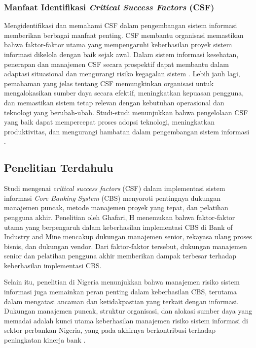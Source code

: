 \documentclass[journal,article,submit,pdftex,moreauthors]{Definitions/mdpi}
\begin{document}
\subsubsection{Manfaat Identifikasi \textit{Critical Success Factors} (CSF)}
Mengidentifikasi dan memahami CSF dalam pengembangan sistem informasi memberikan berbagai manfaat penting. CSF membantu organisasi memastikan bahwa faktor-faktor utama yang mempengaruhi keberhasilan proyek sistem informasi dikelola dengan baik sejak awal. Dalam sistem informasi kesehatan, penerapan dan manajemen CSF secara prospektif dapat membantu dalam adaptasi situasional dan mengurangi risiko kegagalan sistem \cite{aggestam2023apply}. Lebih jauh lagi, pemahaman yang jelas tentang CSF memungkinkan organisasi untuk mengalokasikan sumber daya secara efektif, meningkatkan kepuasan pengguna, dan memastikan sistem tetap relevan dengan kebutuhan operasional dan teknologi yang berubah-ubah. Studi-studi menunjukkan bahwa pengelolaan CSF yang baik dapat mempercepat proses adopsi teknologi, meningkatkan produktivitas, dan mengurangi hambatan dalam pengembangan sistem informasi \cite{jayakody2023devops}.


\subsection{Penelitian Terdahulu} \label{sec:Penelitian Terdahulu}

Studi mengenai \textit{critical success factors} (CSF) dalam implementasi sistem informasi \textit{Core Banking System} (CBS) menyoroti pentingnya dukungan manajemen puncak, metode manajemen proyek yang tepat, dan pelatihan pengguna akhir. Penelitian oleh Ghafari, H \cite{Ghafari-csf} menemukan bahwa faktor-faktor utama yang berpengaruh dalam keberhasilan implementasi CBS di Bank of Industry and Mine mencakup dukungan manajemen senior, rekayasa ulang proses bisnis, dan dukungan vendor. Dari faktor-faktor tersebut, dukungan manajemen senior dan pelatihan pengguna akhir memberikan dampak terbesar terhadap keberhasilan implementasi CBS.

Selain itu, penelitian di Nigeria menunjukkan bahwa manajemen risiko sistem informasi juga memainkan peran penting dalam keberhasilan CBS, terutama dalam mengatasi ancaman dan ketidakpastian yang terkait dengan informasi. Dukungan manajemen puncak, struktur organisasi, dan alokasi sumber daya yang memadai adalah kunci utama keberhasilan manajemen risiko sistem informasi di sektor perbankan Nigeria, yang pada akhirnya berkontribusi terhadap peningkatan kinerja bank \cite{falisat-csf}.
\end{document}
